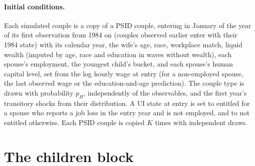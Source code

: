 \documentclass[11pt]{article}
\newcommand{\1}{\mathbf{1}}
\begin{document}
\paragraph{Initial conditions.}\label{sec:init} Each simulated couple is a copy of a PSID couple, entering in January
of the year of its first observation from 1984 on (couples observed earlier enter with their 1984 state) with its
calendar year, the wife's age, race, workplace match, liquid wealth (imputed by age, race and education in waves without wealth), each spouse's
employment, the youngest child's bucket, and each spouse's human capital level, set from the log hourly wage at entry
(for a non-employed spouse, the last observed wage or the education-and-age prediction). The couple type is drawn
with probability $p_H$, independently of the observables, and the first year's transitory shocks from their
distribution. A UI state at entry is set to entitled for a spouse who reports a job loss in the entry year and is not
employed, and to not entitled otherwise. Each PSID couple is copied $K$ times with independent draws.

\section{The children block}\label{sec:children}
\end{document}
